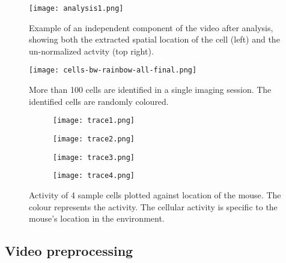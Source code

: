 \begin{figure}[h]
    \texttt{[image: analysis1.png]}
    \caption[Sample analysis data from a calcium imaging video.]{Example of an independent component of the video after analysis, showing both the extracted spatial location of the cell (left) and the un-normalized actvity (top right). \label{f.analysis}}
\end{figure}


\begin{figure}[h]
    \texttt{[image: cells-bw-rainbow-all-final.png]}
    \caption[Cells identified in a single imaging session.]{More than 100 cells are identified in a single imaging session. The identified cells are randomly coloured. \label{f.ca1rainbow}}
\end{figure}


\begin{figure}[h]
    \begin{subfigure}[t]{.5\linewidth}
        \texttt{[image: trace1.png]}
    \end{subfigure}
    \begin{subfigure}[t]{.5\linewidth}
        \texttt{[image: trace2.png]}
    \end{subfigure}
    \begin{subfigure}[t]{.5\linewidth}
        \texttt{[image: trace3.png]}
    \end{subfigure}
    \begin{subfigure}[t]{.5\linewidth}
        \texttt{[image: trace4.png]}
    \end{subfigure}
    \caption[Detection of potential place cells in \gls{ca1} calcium imaging.]{Activity of 4 sample cells plotted against location of the mouse. The colour represents the  activity. The cellular activity is specific to the mouse's location in the environment. \label{f.traceplot}}
\end{figure}

\subsection{Video preprocessing}
